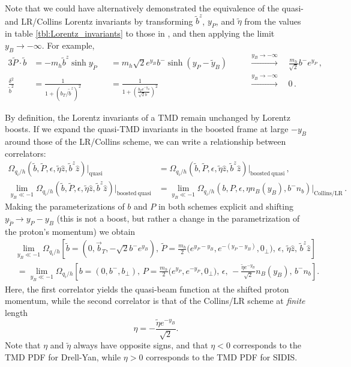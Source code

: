 \documentclass[11pt,a4paper]{article}
\newcommand{\eps}{\epsilon}
\newcommand{\nn}{\nonumber}
\newcommand{\bt}{\vec b_T}
\newcommand{\Corr}{\Omega}
\newcommand{\q}{q_i}
\newcommand{\nB}{n_B}
\begin{document}
Note that we could have alternatively demonstrated the equivalence of the quasi- and LR/Collins Lorentz invariants by transforming 
$\tilde b^z$, $y_P$, and $\tilde\eta$ from the values in table
\ref{tbl:Lorentz_invariants} to those in , and then applying the limit $y_B \to -\infty$.
For example,
\begin{alignat}{3}
\tilde P \cdot\tilde b &
 = -m_h \tilde b^z \sinh y_{\tilde P}
 && = m_h \sqrt2 e^{y_B} b^- \sinh(y_P - \tilde y_B)
 && \quad\stackrel{y_B \to -\infty}{\longrightarrow}\quad
 \frac{m_h}{\sqrt 2} b^- e^{y_P}
\,,\nn\\
 \frac{\delta^2}{\tilde b^2} &
 = \frac{1}{1 + (b_T / \tilde b^z)^2}
 && = \frac{1}{1 + \left(\frac{b_T e^{-y_B}}{\sqrt2 b^-}\right)^2}
 && \quad\stackrel{y_B \to -\infty}{\longrightarrow}\quad 0
\,.\end{alignat}

By definition, the Lorentz invariants of a TMD remain unchanged by Lorentz boosts. 
If we expand the quasi-TMD invariants in the boosted frame at large $-y_B$ around those of the LR/Collins scheme,
we can write a relationship between correlators:
\begin{align}
 \Corr_{\q/h}(\tilde b,\tilde P, \eps, \tilde\eta \hat z, \tilde b^z \hat z) \Big|_\mathrm{quasi}
 &= \Corr_{\q/h}(\tilde b, \tilde P, \eps, \tilde\eta \hat z, \tilde b^z \hat z) \Big|_\mathrm{boosted~quasi}
\,,\\
 \lim_{y_B \ll -1} \Corr_{\q/h}(\tilde b, \tilde P, \eps, \tilde\eta \hat z, \tilde b^z \hat z) \Big|_\mathrm{boosted~quasi}
 &= \lim_{y_B \ll -1} \Corr_{\q/h}(b, P, \eps, \eta\nB(y_B), b^- n_b ) \Big|_\mathrm{Collins/LR}
\,.\nn\end{align}
Making the parameterizations of $b$ and $P$ in both schemes explicit
and shifting $ y_{\tilde P} \to y_P - y_B$
(this is not a boost, but rather a change in the parametrization of the proton's momentum)
 we obtain 
\begin{align} \label{eq:relation_boosted_TMDs}
 & \lim_{y_B \ll -1}  \Corr_{\q/h}\left[ \tilde b \!=\! (0, \bt, - \sqrt{2} b^- e^{y_B}),\,
  \tilde P \!=\! \frac{m_h}{2} \bigl(e^{y_P - y_B}, e^{-(y_P - y_B)}, 0_\perp\bigr),\, \eps,\, \tilde\eta \hat z,\, \tilde b^z \hat z \right]
 \nn\\
 &\: 
  = \lim_{y_B \ll -1}\!\! \Corr_{\q/h}\left[ b \!=\! (0, b^-, b_\perp),\, P \!=\! \frac{m_h}{2}\bigl(e^{y_P}, e^{-y_P}, 0_\perp\bigr),\, \eps,\,  - \frac{\tilde\eta e^{-y_B}}{\sqrt 2} n_B(y_B),\, b^- n_b\right].
\end{align}
Here, the first correlator yields the quasi-beam function at the shifted proton momentum,
while the second correlator is that of the Collins/LR scheme at \emph{finite} length
\begin{equation}
	\eta = -\frac{\tilde\eta e^{-y_B}}{\sqrt 2}.
\end{equation}
Note that $\eta$ and $\tilde\eta$ always have opposite signs, and that $\eta<0$ corresponds to the TMD PDF for Drell-Yan, while $\eta>0$ corresponds to the TMD PDF for SIDIS.
\end{document}
